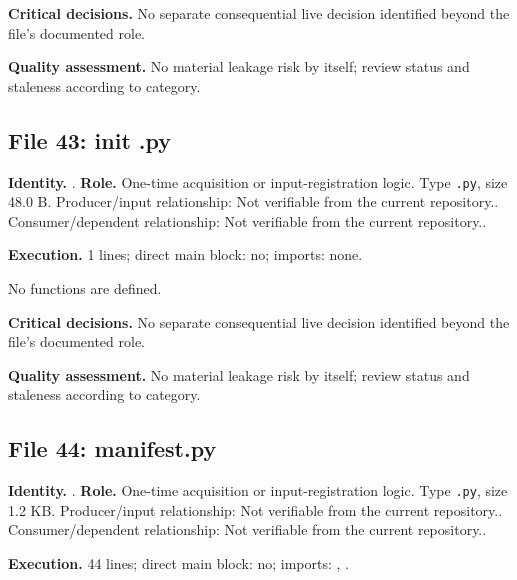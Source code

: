 \documentclass[
  11pt,
  a4paper]{article}
\newcounter{none} %
\begin{document}
\textbf{Critical decisions.} No separate consequential live decision
identified beyond the file's documented role.

\textbf{Quality assessment.} No material leakage risk by itself; review
status and staleness according to category.

\subsection{File 43: init .py}\label{file-7595306214455870148}

\textbf{Identity.} . \textbf{Role.}
One-time acquisition or input-registration logic. Type \texttt{.py},
size 48.0 B. Producer/input relationship: Not verifiable from the
current repository.. Consumer/dependent relationship: Not verifiable
from the current repository..

\textbf{Execution.} 1 lines; direct main block: no; imports: none.

No functions are defined.

\textbf{Critical decisions.} No separate consequential live decision
identified beyond the file's documented role.

\textbf{Quality assessment.} No material leakage risk by itself; review
status and staleness according to category.

\subsection{File 44: manifest.py}\label{file-6505165765951101748}

\textbf{Identity.} . \textbf{Role.}
One-time acquisition or input-registration logic. Type \texttt{.py},
size 1.2 KB. Producer/input relationship: Not verifiable from the
current repository.. Consumer/dependent relationship: Not verifiable
from the current repository..

\textbf{Execution.} 44 lines; direct main block: no; imports:
, .
\end{document}
